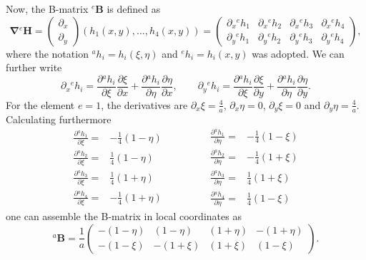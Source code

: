 \documentclass[a4paper,11pt]{article}
\numberwithin{equation}{section}
\newcommand\matr[1]{\ensuremath{\boldsymbol{\mathbf{#1}}}}
\newcommand\vect[1]{\ensuremath{\bm{#1}}}
\begin{document}
{Now, the B-matrix ${}^e \matr{B}$ is defined as \begin{equation}
	\vect{\nabla}{}^e\vect{H} = \begin{pmatrix}
		\partial_x \\ \partial_y
	\end{pmatrix} (h_1(x,y),\dots,h_4(x,y)) = \begin{pmatrix}
		\partial_x {}^e h_1 & \partial_x{}^e  h_2 & \partial_x{}^e  h_3 & \partial_x {}^e h_4 \\
		\partial_y {}^e h_1 & \partial_y{}^e  h_2 & \partial_y{}^e  h_3 & \partial_y {}^e h_4
	\end{pmatrix},
\end{equation} where the notation ${}^a h_i = h_i(\xi,\eta)$ and ${}^e h_i = h_i(x,y)$ was adopted. We can further write \begin{equation}
	\partial_x {}^e h_i = \frac{\partial {}^a h_i}{\partial \xi}\frac{\partial \xi}{\partial x} + \frac{\partial {}^a h_i}{\partial \eta}\frac{\partial \eta}{\partial x}, \qquad \partial_y {}^e h_i = \frac{\partial {}^a h_i}{\partial \xi}\frac{\partial \xi}{\partial y} + \frac{\partial {}^a h_i}{\partial \eta}\frac{\partial \eta}{\partial y}.
\end{equation} For the element $e=1$, the derivatives are $\partial_x \xi = \frac{4}{a}$, $\partial_x \eta = 0$, $\partial_y \xi = 0$ and $\partial_y \eta = \frac{4}{a}$. Calculating furthermore \begin{equation}
	\begin{matrix}
		\frac{\partial {}^a h_1}{\partial \xi} =& -\frac{1}{4}(1-\eta) \\
		\frac{\partial {}^a h_2}{\partial \xi} =& \frac{1}{4}(1-\eta) \\
		\frac{\partial {}^a h_3}{\partial \xi} =& \frac{1}{4}(1+\eta) \\
		\frac{\partial {}^a h_4}{\partial \xi} =& -\frac{1}{4}(1+\eta)
	\end{matrix} \qquad  \qquad
	\begin{matrix}
		\frac{\partial {}^a h_1}{\partial \eta} =& -\frac{1}{4}(1-\xi) \\
		\frac{\partial {}^a h_2}{\partial \eta} =& -\frac{1}{4}(1+\xi) \\
		\frac{\partial {}^a h_3}{\partial \eta} =& \frac{1}{4}(1+\xi) \\
		\frac{\partial {}^a h_4}{\partial \eta} =& \frac{1}{4}(1-\xi)
	\end{matrix}
\end{equation} one can assemble the B-matrix in local coordinates as \begin{equation}
	{}^a \matr{B} = \frac{1}{a}\begin{pmatrix}
		-(1-\eta) & (1-\eta) & (1 + \eta) & - (1+\eta) \\
		-(1-\xi) & -(1+\xi) & (1 + \xi) & (1 - \xi)
	\end{pmatrix}.
\end{equation}

}
\end{document}
